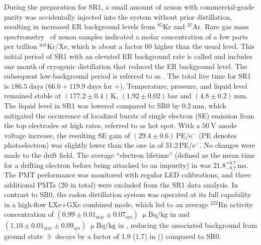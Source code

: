 \documentclass[
    reprint,
    superscriptaddress,
    aps, prl,
    amsmath,amssymb,
    twocolumn,
    showkeys,
    floatfix,
    nofootinbib,
]{revtex4-2}
\begin{document}
During the preparation for SR1, a small amount of xenon with commercial-grade purity was accidentally injected into the system without prior distillation, resulting in increased ER background levels from $^{85}\mathrm{Kr}$ and $^{37}\mathrm{Ar}$.
Rare gas mass spectrometry~\cite{Lindemann:2013kna} of xenon samples indicated a molar concentration of a few parts per trillion $^\text{nat}\text{Kr}$/Xe, which is about a factor 60 higher than the usual level.
This initial period of SR1 with an elevated ER background rate is called \sronea and includes one month of cryogenic distillation that reduced the ER background level.
The subsequent low-background period is referred to as \sroneb.
The total live time for SR1 is $186.5\;\text{days}$ ($66.6+119.9\;\text{days}$ for \sronea+\xspace\sroneb).
Temperature, pressure, and liquid level remained stable at $(177.2 \pm 0.4)\,\mathrm{K}$, $(1.92 \pm 0.02)\,\mathrm{bar}$ and $(4.8 \pm 0.2)\,\mathrm{mm}$.
The liquid level in SR1 was lowered compared to SR0 by $\SI{0.2}{\mm}$, which mitigated the occurrence of localized bursts of single electron (SE) emission from the top electrodes at high rates, referred to as hot spot.
With a $\SI{50}{\V}$ anode voltage increase, the resulting SE gain of $(29.4\pm0.6)$\,PE/e$^-$ (PE denotes photoelectron) was slightly lower than the one in \srzero of 31.2\,PE/e$^-$.
No changes were made to the drift field.
The average ``electron lifetime'' (defined as the mean time for a drifting electron before being attached to an impurity) in \srone was $21.8_{-9.7}^{+6.7}\,\mathrm{ms}$.
The PMT performance was monitored with regular LED calibrations, and three additional PMTs (20 in total) were excluded from the SR1 data analysis.
In contrast to SR0, the radon distillation system was operated at its full capability in a high-flow LXe+GXe combined mode, which led to an average $^{222}\text{Rn}$ activity concentration of $\left(0.99\pm 0.01_{\text{stat}}\pm 0.07_{\text{sys}}\right)\;\upmu\text{Bq}/\text{kg}$ in \sronea and $\left(1.10\pm 0.01_{\text{stat}}\pm 0.09_{\text{sys}}\right)\;\upmu\text{Bq}/\text{kg}$ in , reducing the associated background from  ground state $\upbeta$ decays by a factor of 1.9 (1.7) in \sronea (\sroneb) compared to SR0.
\end{document}
